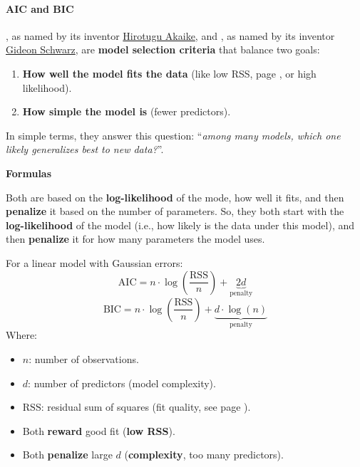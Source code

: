 \paragraph{AIC and BIC}

, as named by its inventor \href{https://en.wikipedia.org/wiki/Hirotugu_Akaike}{Hirotugu Akaike}, and , as named by its inventor \href{https://www.jstor.org/stable/2958889}{Gideon Schwarz}\cite{bicGideonSchwarz}, are \textbf{model selection criteria} that balance two goals:
\begin{enumerate}
    \item \textbf{How well the model fits the data} (like low RSS, page \pageref{eq: RSS}, or high likelihood).
    \item \textbf{How simple the model is} (fewer predictors).
\end{enumerate}
In simple terms, they answer this question: ``\emph{among many models, which one likely generalizes best to new data?}''.

\highspace
\begin{flushleft}
    \textcolor{Green3}{ \textbf{Formulas}}
\end{flushleft}
Both are based on the \textbf{log-likelihood} of the mode, how well it fits, and then \textbf{penalize} it based on the number of parameters. So, they both start with the \textbf{log-likelihood} of the model (i.e., how likely is the data under this model), and then \textbf{penalize} it for how many parameters the model uses.

\highspace
For a linear model with Gaussian errors:
\begin{equation}
    \text{AIC} = n \cdot \log\left(\dfrac{\text{RSS}}{n}\right) + \underbrace{2d}_{\text{penalty}}
\end{equation}
\begin{equation}
    \text{BIC} = n \cdot \log\left(\dfrac{\text{RSS}}{n}\right) + \underbrace{d \cdot \log(n)}_{\text{penalty}}
\end{equation}
Where:
\begin{itemize}
    \item $n$: number of observations.
    \item $d$: number of predictors (model complexity).
    \item $\text{RSS}$: residual sum of squares (fit quality, see page \pageref{eq: RSS}).
    \item[\textcolor{Green3}{\faIcon{check-circle}}] Both \textbf{reward} good fit (\textbf{low RSS}).
    \item[\textcolor{Red2}{\faIcon{times-circle}}] Both \textbf{penalize} large $d$ (\textbf{complexity}, too many predictors).
\end{itemize}


